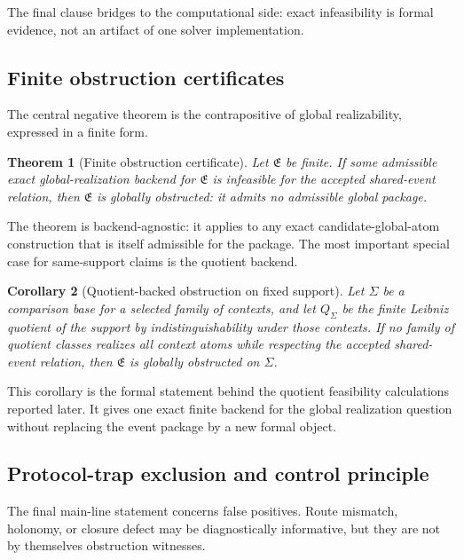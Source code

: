 \documentclass[11pt]{article}
\newcommand{\EventPackage}{\mathfrak{E}}
\newtheorem{theorem}{Theorem}[section]
\newtheorem{corollary}[theorem]{Corollary}
\theoremstyle{definition}
\begin{document}
The final clause bridges to the computational side: exact infeasibility is formal evidence, not an artifact of one solver implementation.

\subsection{Finite obstruction certificates}

The central negative theorem is the contrapositive of global realizability, expressed in a finite form.

\begin{theorem}[Finite obstruction certificate]\label{thm:finite-obstruction}
Let \(\EventPackage\) be finite. If some admissible exact global-realization backend for \(\EventPackage\) is infeasible for the accepted shared-event relation, then \(\EventPackage\) is globally obstructed: it admits no admissible global package.
\end{theorem}

The theorem is backend-agnostic: it applies to any exact candidate-global-atom construction that is itself admissible for the package. The most important special case for same-support claims is the quotient backend.

\begin{corollary}[Quotient-backed obstruction on fixed support]\label{cor:quotient-obstruction}
Let \(\Sigma\) be a comparison base for a selected family of contexts, and let \(Q_\Sigma\) be the finite Leibniz quotient of the support by indistinguishability under those contexts. If no family of quotient classes realizes all context atoms while respecting the accepted shared-event relation, then \(\EventPackage\) is globally obstructed on \(\Sigma\).
\end{corollary}

This corollary is the formal statement behind the quotient feasibility calculations reported later. It gives one exact finite backend for the global realization question without replacing the event package by a new formal object.

\subsection{Protocol-trap exclusion and control principle}

The final main-line statement concerns false positives. Route mismatch, holonomy, or closure defect may be diagnostically informative, but they are not by themselves obstruction witnesses.
\end{document}

